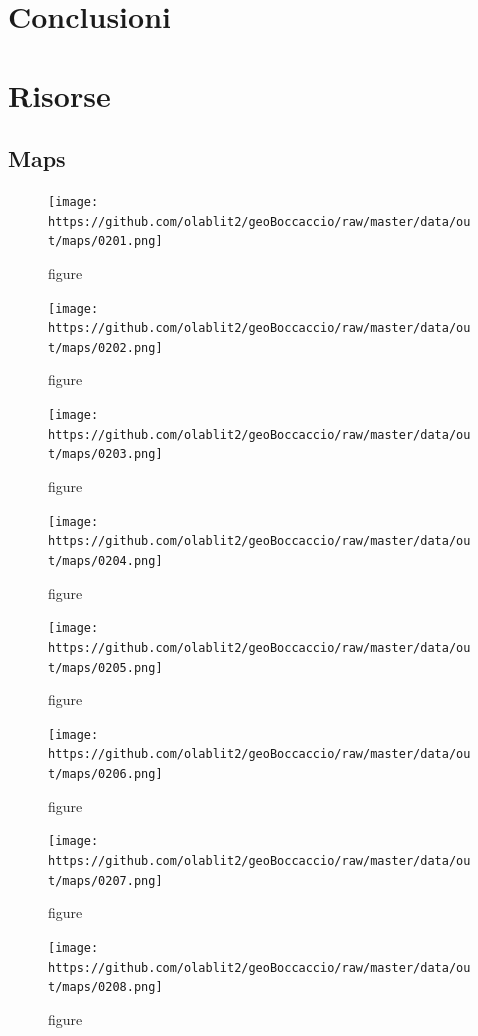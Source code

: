 \section{Conclusioni}\label{conclusioni}

\section{Risorse}\label{risorse}

\subsection{Maps}\label{maps}

\begin{figure}
\centering
\texttt{[image: https://github.com/olablit2/geoBoccaccio/raw/master/data/out/maps/0201.png]}
\caption{figure}
\end{figure}

\begin{figure}
\centering
\texttt{[image: https://github.com/olablit2/geoBoccaccio/raw/master/data/out/maps/0202.png]}
\caption{figure}
\end{figure}

\begin{figure}
\centering
\texttt{[image: https://github.com/olablit2/geoBoccaccio/raw/master/data/out/maps/0203.png]}
\caption{figure}
\end{figure}

\begin{figure}
\centering
\texttt{[image: https://github.com/olablit2/geoBoccaccio/raw/master/data/out/maps/0204.png]}
\caption{figure}
\end{figure}

\begin{figure}
\centering
\texttt{[image: https://github.com/olablit2/geoBoccaccio/raw/master/data/out/maps/0205.png]}
\caption{figure}
\end{figure}

\begin{figure}
\centering
\texttt{[image: https://github.com/olablit2/geoBoccaccio/raw/master/data/out/maps/0206.png]}
\caption{figure}
\end{figure}

\begin{figure}
\centering
\texttt{[image: https://github.com/olablit2/geoBoccaccio/raw/master/data/out/maps/0207.png]}
\caption{figure}
\end{figure}

\begin{figure}
\centering
\texttt{[image: https://github.com/olablit2/geoBoccaccio/raw/master/data/out/maps/0208.png]}
\caption{figure}
\end{figure}

